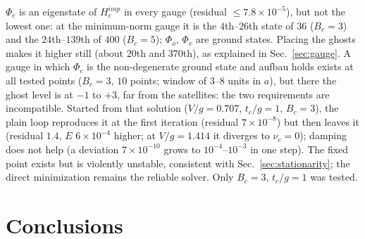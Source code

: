 \documentclass[11pt]{article}
\begin{document}
$\Phi_c$ is an eigenstate of $H^{imp}_c$ in every gauge (residual $\le7.8\times10^{-5}$), but not the lowest one: at the minimum-norm gauge it is the $4$th--$26$th state of $36$ ($B_c=3$) and the $24$th--$139$th of $400$ ($B_c=5$); $\Phi_o$, $\Phi_v$ are ground states. Placing the ghosts makes it higher still (about $20$th and $370$th), as explained in Sec.~\ref{sec:gauge}.
A gauge in which $\Phi_c$ is the non-degenerate ground state and aufbau holds exists at all tested points ($B_c=3$, $10$ points; window of $3$--$8$ units in $a$), but there the ghost level is at $-1$ to $+3$, far from the satellites: the two requirements are incompatible.
Started from that solution ($V/g=0.707$, $t_c/g=1$, $B_c=3$), the plain loop reproduces it at the first iteration (residual $7\times10^{-8}$) but then leaves it (residual $1.4$, $E$ $6\times10^{-4}$ higher; at $V/g=1.414$ it diverges to $\nu_c=0$); damping does not help (a deviation $7\times10^{-10}$ grows to $10^{-4}$--$10^{-3}$ in one step).
The fixed point exists but is violently unstable, consistent with Sec.~\ref{sec:stationarity}; the direct minimization remains the reliable solver. Only $B_c=3$, $t_c/g=1$ was tested.


\section{Conclusions}
\label{sec:conclusion}
\end{document}
